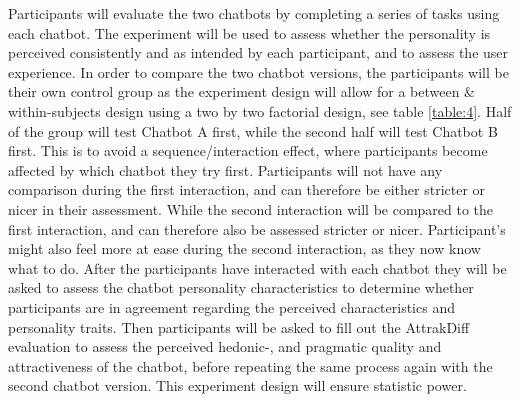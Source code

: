    Participants will evaluate the two chatbots by completing a series of tasks using each chatbot. The experiment will be used to assess whether the personality is perceived consistently and as intended by each participant, and to assess the user experience. In order to compare the two chatbot versions, the participants will be their own control group as the experiment design will allow for a between \& within-subjects design using a two by two factorial design, see table \ref{table:4}. Half of the group will test Chatbot A first, while the second half will test Chatbot B first. This is to avoid a sequence/interaction effect, where participants become affected by which chatbot they try first. Participants will not have any comparison during the first interaction, and can therefore be either stricter or nicer in their assessment. While the second interaction will be compared to the first interaction, and can therefore also be assessed stricter or nicer. Participant's might also feel more at ease during the second interaction, as they now know what to do. After the participants have interacted with each chatbot they will be asked to assess the chatbot personality characteristics to determine whether participants are in agreement regarding the perceived characteristics and personality traits. Then participants will be asked to fill out the AttrakDiff evaluation to assess the perceived hedonic-, and pragmatic quality and attractiveness of the chatbot, before repeating the same process again with the second chatbot version. This experiment design will ensure statistic power.
  
    
